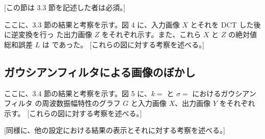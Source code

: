 \documentclass[dvipdfmx]{jsarticle}
\begin{document}
[この節は 3.3 節を記述した者は必須。]

ここに、3.3 節の結果と考察を示す。図 4 に、入力画像 $X$ とそれを DCT した後に逆変換を行っ
た出力画像 $Z$ をそれぞれ示す。また、これら $X$ と $Z$ の絶対値総和誤差 $L$ は であった。
[これらの図に対する考察を述べる。]





\subsection{ガウシアンフィルタによる画像のぼかし}

ここに、3.4 節の結果と考察を示す。図 5 に、$k =$ と $\sigma =$ におけるガウシアンフィルタ
の周波数振幅特性のグラフ $G$ と入力画像 $X$、出力画像 $Y$ をそれぞれ示す。
[これらの図に対する考察を述べる。]

[同様に、他の設定における結果の表示とそれに対する考察を述べる。]



\end{document}
